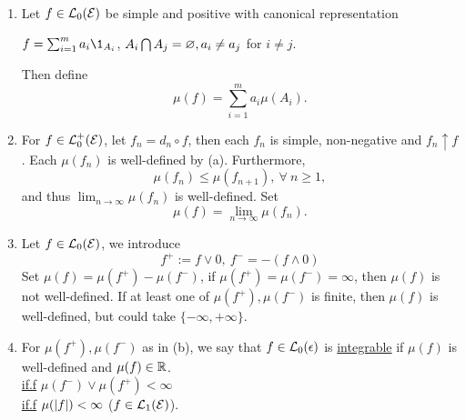 \vspace{6pt}
\begin{definition}\ 
\begin{enumerate}[label = (\alph*)]
    \item Let $f \in \mathcal{L}_0(\mathcal{E})$ be simple and positive with canonical representation 
    \begin{center}
        $f = \sum_{i=1}^m a_i \1_{A_i}$, $A_i \bigcap A_j = \varnothing, a_i \neq a_j$ for $ i\neq j$.
    \end{center}
    Then define \begin{equation*}
        \mu(f) = \sum_{i=1}^m a_i \mu(A_i).
    \end{equation*}
    
   \item For $f \in \mathcal{L}_0^+(\mathcal{E})$, let $f_n = d_n \circ f$, then each $f_n$ is simple, non-negative and $f_n \uparrow f$. Each $\mu(f_n)$ is well-defined by (a). Furthermore, \begin{equation*}
       \mu(f_n) \leq \mu(f_{n+1}),\ \forall\ n \geq 1,
   \end{equation*} 
   and thus $\lim_{n \to \infty} \mu(f_n)$ is well-defined. Set 
   \begin{equation*}
   \mu(f) = \lim_{n \to \infty} \mu(f_n).    
   \end{equation*} 
   
   \item Let $f \in \mathcal{L}_0(\mathcal{E})$, we introduce
   \begin{equation*}
       f^+ := f \vee 0,\ f^- = -(f \wedge 0)
   \end{equation*}
   Set $\mu(f) = \mu(f^+) - \mu(f^-)$, if $\mu(f^+) = \mu(f^-) = \infty$, then $\mu(f)$ is not well-defined. If at least one of $\mu(f^+),\mu(f^-)$ is finite, then $\mu(f)$ is well-defined, but could take $\{-\infty,+\infty\}$. 
   \item For $\mu(f^+), \mu(f^-)$ as in (b), we say that $f \in \mathcal{L}_0(\epsilon)$ is \underline{integrable} if $\mu(f)$ is well-defined and $\mu(f) \in \mathbb{R}$.\\
   \underline{if.f} $\mu(f^-) \vee \mu(f^+) < \infty$\\
   \underline{if.f} $\mu(\abs{f}) < \infty$ ($f \in \mathcal{L}_1(\mathcal{E})$).
\end{enumerate}
\end{definition}

